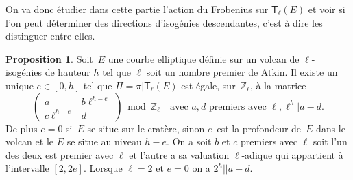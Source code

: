 \documentclass[10pt,a4paper]{book}
\theoremstyle{plain}
\theoremstyle{definition}
\theoremstyle{definition}
\theoremstyle{definition}
\newtheorem{prop}[thm]{Proposition}
\theoremstyle{definition}
\theoremstyle{remark}
\theoremstyle{remark}
\theoremstyle{definition}
\begin{document}
On va donc étudier dans cette partie l'action du Frobenius sur 
$\mathsf{T}_{\ell}(E)$ et voir si l'on peut déterminer des directions 
d'isogénies descendantes, c'est à dire les distinguer entre elles.
\begin{prop}\label{pro:mat:fro:atk}
Soit~$E$ une courbe elliptique définie sur un volcan de $\ell$-isogénies de 
hauteur $h$ tel que $\ell$ soit un nombre premier de Atkin. Il existe un unique
$e \in [ 0, h]$ tel que $\Pi=\pi|\mathsf{T}_{\ell}(E)$ est égale, sur~$\mathbb{Z}_{\ell}$, à
 la matrice 
\begin{equation*}
\left ( \begin{matrix}a & b\ell^{h-e} \\ c\ell^{h-e} & d
\end{matrix}\right ) \bmod \mathbb{Z}_{\ell} \quad \text{avec }a,d \text{ premiers avec }\ell, \ell^{h} |a-d.
\end{equation*}
De plus $e = 0$ si~$E$ se situe sur le cratère, sinon $e$~est la profondeur 
de~$E$ dans le volcan et le $E$ se situe au niveau $h-e$.
On a soit $b$ et $c$ premiers avec $\ell$ soit l'un des deux est premier avec 
$\ell$ et l'autre a sa valuation $\ell$-adique qui appartient à l'intervalle 
$[2,2e]$. Lorsque $\ell=2$ et $e=0$ on a $2^{h} || a-d$.
\end{prop}
\end{document}
